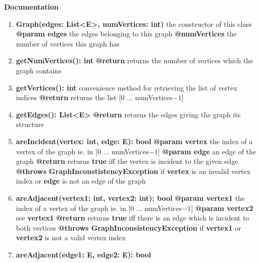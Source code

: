 \documentclass{article}
\begin{document}
	\textbf{Documentation}
	\begin{enumerate}[+]
		\item{
			\textbf{Graph(edges: List<E>, numVertices: int)} \newline
			the constructor of this class \newline
			\textbf{@param edges} the edges belonging to this graph
			\textbf{@numVertices} the number of vertices this graph has
		}
		\item{
			\textbf{getNumVertices(): int} \newline
			\textbf{@return} returns the number of vertices which the graph contains
		}
		\item{
			\textbf{getVertices(): int} \newline
			convenience method for retrieving the list of vertex indices \newline
			\textbf{@return} returns the list [0 ... numVertices$-1$]
		}
		\item{
			\textbf{getEdges(): List<E>} \newline
			\textbf{@return} returns the edges giving the graph its structure
		}
		\item{
			\textbf{areIncident(vertex: int, edge: E): bool} \newline
			\textbf{@param vertex} the index of a vertex of the graph ie. in [0 ... numVertices$-1$]\newline
			\textbf{@param edge} an edge of the graph \newline 
			\textbf{@return} returns \textbf{true} iff the vertex is incident to the given edge \newline
			\textbf{@throws GraphInconstistencyException} if \textbf{vertex} is an invalid vertex index or \textbf{edge} is not an edge of the graph
		}
		\item{
			\textbf{areAdjacent(vertex1: int, vertex2: int): bool} \newline
			\textbf{@param vertex1} the index of a vertex of the graph ie. in [0 ... numVertices$-1$] \newline
			\textbf{@param vertex2} see \textbf{vertex1} \newline
			\textbf{@return} returns \textbf{true} iff there is an edge which is incident to both vertices \newline
			\textbf{@throws GraphInconsistencyException} if \textbf{vertex1} or \textbf{vertex2} is not a valid vertex index
		}
		\item{
			\textbf{areAdjacent(edge1: E, edge2: E): bool} \newline
}
\end{enumerate}
\end{document}
